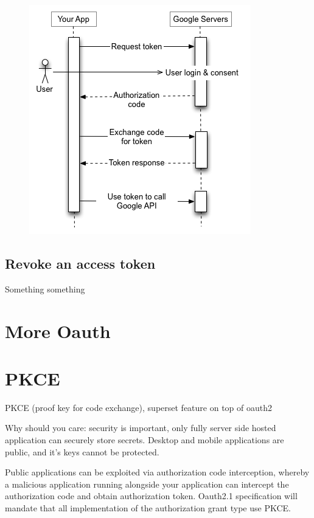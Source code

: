 \documentclass[20pt]{style}
\begin{document}
\begin{figure}[h]
    \centering
    \includegraphics[width=.5\textwidth]{authorization-code.png}
\end{figure}
\subsection{Revoke an access token}
Something something



\section{More Oauth}


\section{PKCE}
PKCE (proof key for code exchange), superset feature on top of oauth2


Why should you care:
security is important, only fully server side hosted application can securely
store secrets. Desktop and mobile applications are public, and it's keys cannot
be protected.

Public applications can be exploited via authorization code interception,
whereby a malicious application running alongside your application can intercept
the authorization code and obtain authorization token.
Oauth2.1 specification will mandate that all implementation of the authorization
grant type use PKCE.
\end{document}

